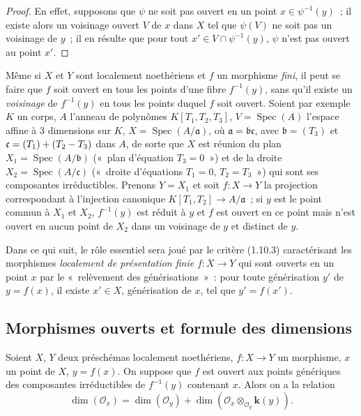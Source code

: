\begin{proof}
En effet, supposons que $\psi$ ne soit pas ouvert en un point
$x\in\psi^{-1}(y)$~; il existe alors un voisinage ouvert $V$ de $x$ dans $X$ tel
que $\psi(V)$ ne soit pas un voisinage de $y$~; il en résulte que pour tout
$x'\in V\cap\psi^{-1}(y)$, $\psi$ n'est pas ouvert au point $x'$.
\end{proof}

\begin{remark}[14.1.5]
\label{IV.14.1.5-fr}
Même si $X$ et $Y$ sont localement noethériens et $f$ un morphisme \emph{fini},
il peut se faire que $f$ soit ouvert en tous les points d'une fibre $f^{-1}(y)$,
sans qu'il existe un \emph{voisinage} de $f^{-1}(y)$ en tous les points duquel $f$
soit ouvert. Soient par exemple $K$ un corps, $A$ l'anneau de polynômes
$K[T_1,T_2,T_3]$, $V=\operatorname{Spec}(A)$ l'espace affine à 3 dimensions sur
$K$, $X=\operatorname{Spec}(A/\mathfrak a)$, où $\mathfrak a=\mathfrak b\mathfrak c$,
avec $\mathfrak b=(T_3)$ et $\mathfrak c=(T_1)+(T_2- T_3)$ dans $A$, de sorte que
$X$ est réunion du plan $X_1=\operatorname{Spec}(A/\mathfrak b)$ («~plan
d'équation $T_3=0$~») et de la droite $X_2=\operatorname{Spec}(A/\mathfrak c)$
(«~droite d'équations $T_1=0$, $T_2=T_3$~») qui sont ses composantes
irréductibles. Prenons $Y=X_1$ et soit $f:X\to Y$ la projection correspondant à
l'injection canonique $K[T_1,T_2]\to A/\mathfrak a$~; si $y$ est le point commun
à $X_1$ et $X_2$, $f^{-1}(y)$ est réduit à $y$ et $f$ est ouvert en ce point mais
n'est ouvert en aucun point de $X_2$ dans un voisinage de $y$ et distinct de $y$.
\end{remark}

\begin{env}[14.1.6]
\label{IV.14.1.6-fr}
Dans ce qui suit, le rôle essentiel sera joué par le critère (1.10.3)
caractérisant les morphismes \emph{localement de présentation finie} $f:X\to Y$
qui sont ouverts en un point $x$ par le «~relèvement des générisations~»~: pour
toute générisation $y'$ de $y=f(x)$, il existe $x'\in X$, générisation de $x$, tel
que $y'=f(x')$.
\end{env}

\subsection{Morphismes ouverts et formule des dimensions}
\label{subsection:IV.14.2-fr}

\begin{theorem}[14.2.1]
Soient $X$, $Y$ deux préschémas localement noethériens, $f:X\to Y$ un morphisme,
$x$ un point de $X$, $y=f(x)$. On suppose que $f$ est ouvert aux points génériques
des composantes irréductibles de $f^{-1}(y)$ contenant $x$. Alors on a la relation
\begin{equation}
\tag{14.2.1.1}
\label{IV.14.2.1.1-fr}
  \dim(\mathcal O_x)=\dim(\mathcal O_y)+
  \dim(\mathcal O_x\otimes_{\mathcal O_y}\boldsymbol{k}(y)).
\end{equation}
\end{theorem}

